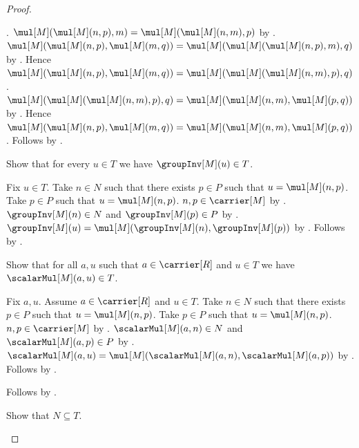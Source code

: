 \begin{proof}
\begin{subproof}
\begin{subproof}
                .
            $\mul[M](\mul[M](n,p),m)=
                \mul[M](\mul[M](n,m),p)$ by
                .
            $\mul[M](\mul[M](n,p),\mul[M](m,q))=
                \mul[M](\mul[M](\mul[M](n,p),m),q)$ by
                .
            Hence $\mul[M](\mul[M](n,p),\mul[M](m,q))=
                \mul[M](\mul[M](\mul[M](n,m),p),q)$.
            $\mul[M](\mul[M](\mul[M](n,m),p),q)=
                \mul[M](\mul[M](n,m),\mul[M](p,q))$ by
                .
            Hence $\mul[M](\mul[M](n,p),\mul[M](m,q))=
                \mul[M](\mul[M](n,m),\mul[M](p,q))$.
            Follows by \auto.
        \end{subproof}
        Show that for every $u\in T$ we have $\groupInv[M](u)\in T$.
        \begin{subproof}
            Fix $u\in T$.
            Take $n\in N$ such that there exists $p\in P$ such that
                $u=\mul[M](n,p)$.
            Take $p\in P$ such that $u=\mul[M](n,p)$.
            $n,p\in\carrier[M]$ by .
            $\groupInv[M](n)\in N$ and $\groupInv[M](p)\in P$ by
                .
            $\groupInv[M](u)=
                \mul[M](\groupInv[M](n),\groupInv[M](p))$ by
                .
            Follows by \auto.
        \end{subproof}
        Show that for all $a,u$ such that $a\in\carrier[R]$ and $u\in T$
            we have $\scalarMul[M](a,u)\in T$.
        \begin{subproof}
            Fix $a,u$.
            Assume $a\in\carrier[R]$ and $u\in T$.
            Take $n\in N$ such that there exists $p\in P$ such that
                $u=\mul[M](n,p)$.
            Take $p\in P$ such that $u=\mul[M](n,p)$.
            $n,p\in\carrier[M]$ by .
            $\scalarMul[M](a,n)\in N$ and
                $\scalarMul[M](a,p)\in P$ by
                .
            $\scalarMul[M](a,u)=
                \mul[M](\scalarMul[M](a,n),
                    \scalarMul[M](a,p))$ by
                .
            Follows by \auto.
        \end{subproof}
        Follows by .
    \end{subproof}
    Show that $N\subseteq T$.
    \begin{subproof}

\end{subproof}
\end{proof}
